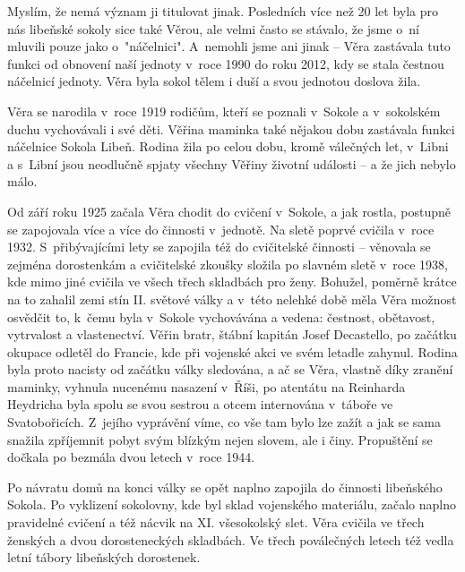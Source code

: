 \documentclass[a5paper, 11pt, twoside]{article}
\begin{document}
Myslím, že nemá význam ji titulovat jinak. Posledních více než 20 let
byla pro nás libeňské sokoly sice také Věrou, ale velmi často se
stávalo, že jsme o~ní mluvili pouze jako o~"náčelnici". A~nemohli jsme
ani jinak -- Věra zastávala tuto funkci od obnovení naší jednoty v~roce
1990 do roku 2012, kdy se stala čestnou náčelnicí jednoty. Věra byla
sokol tělem i duší a svou jednotou doslova žila.

Věra se narodila v~roce 1919 rodičům, kteří se poznali v~Sokole a
v~sokolském duchu vychovávali i své děti. Věřina maminka také nějakou dobu
zastávala funkci náčelnice Sokola Libeň. Rodina žila po celou dobu,
kromě válečných let, v~Libni a s~Libní jsou neodlučně spjaty všechny
Věřiny životní události -- a že jich nebylo málo.

Od září roku 1925 začala Věra chodit do cvičení v~Sokole, a jak rostla,
postupně se zapojovala více a více do činnosti v~jednotě. Na sletě
poprvé cvičila v~roce 1932. S~přibývajícími lety se zapojila též do
cvičitelské činnosti -- věnovala se zejména dorostenkám a cvičitelské
zkoušky složila po slavném sletě v~roce 1938, kde mimo jiné cvičila ve
všech třech skladbách pro ženy. Bohužel, poměrně krátce na to zahalil
zemi stín II. světové války a v~této nelehké době měla Věra možnost
osvědčit to, k~čemu byla v~Sokole vychovávána a vedena: čestnost,
obětavost, vytrvalost a vlastenectví. Věřin bratr, štábní kapitán Josef
Decastello, po začátku okupace odletěl do Francie, kde při vojenské akci
ve svém letadle zahynul. Rodina byla proto nacisty od začátku války
sledována, a ač se Věra, vlastně díky zranění maminky, vyhnula nucenému
nasazení v~Říši, po atentátu na Reinharda Heydricha byla spolu se svou
sestrou a otcem internována v~táboře ve Svatobořicích. Z~jejího
vyprávění víme, co vše tam bylo lze zažít a jak se sama snažila
zpříjemnit pobyt svým blízkým nejen slovem, ale i činy. Propuštění se
dočkala po bezmála dvou letech v~roce 1944.

Po návratu domů na konci války se opět naplno zapojila do činnosti
libeňského Sokola. Po vyklizení sokolovny, kde byl sklad vojenského
materiálu, začalo naplno pravidelné cvičení a též nácvik na XI.
všesokolský slet. Věra cvičila ve třech ženských a dvou dorosteneckých
skladbách. Ve třech poválečných letech též vedla letní tábory libeňských
dorostenek.
\end{document}

